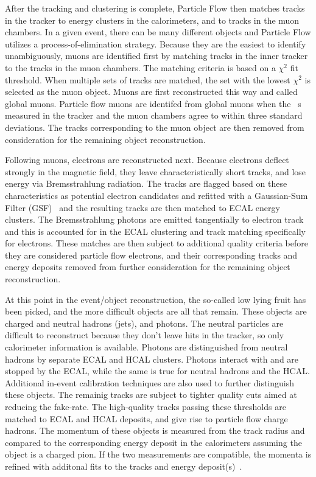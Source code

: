 After the tracking and clustering is complete, Particle Flow then matches tracks in the tracker to energy clusters in the calorimeters, and to tracks in the muon chambers.
In a given event, there can be many different objects and Particle Flow utilizes
a process-of-elimination strategy. Because they are the easiest to identify unambiguously, muons are identified first by matching tracks in the inner tracker to the tracks in
the muon chambers. The matching criteria is based on a $\chi^{2}$ fit threshold. When multiple sets of tracks are matched, the set with the lowest $\chi^{2}$ is selected as the
muon object. Muons are first reconstructed this way and called global muons. Particle flow muons are identifed from global muons when the \pt~s measured in the tracker and the
muon chambers agree to within three standard deviations. The tracks corresponding to the muon object are then removed from consideration for the remaining object reconstruction. 

Following muons, electrons are reconstructed next. Because electrons deflect strongly in the magnetic field, they leave characteristically short tracks, and lose energy via
Bremsstrahlung radiation. The tracks are flagged based on these characteristics as potential electron candidates and refitted with a Gaussian-Sum Filter (GSF)~\cite{gsf} and the
resulting tracks are then matched to ECAL energy clusters. The Bremsstrahlung photons are emitted tangentially to electron track and this is accounted for in the ECAL clustering
and track matching specifically for electrons. These matches are then subject to additional quality criteria before they are considered particle flow electrons, and their
corresponding tracks and energy deposits removed from further consideration for the remaining object reconstruction. 

At this point in the event/object reconstruction, the so-called low lying fruit has been picked, and the more difficult objects are all that remain. These objects are charged
and neutral hadrons (jets), and photons. The neutral particles are difficult to reconstruct because they don't leave hits in the tracker, so only calorimeter information is
available. Photons are distinguished from neutral hadrons by separate ECAL and HCAL clusters. Photons interact with and are stopped by the ECAL, while the same is true for
neutral hadrons and the HCAL. Additional in-event calibration techniques are also used to further distinguish these objects. The remainig tracks are subject to tighter
quality cuts aimed at reducing the fake-rate. The high-quality tracks passing these thresholds are matched to ECAL and HCAL deposits, and give rise to particle flow 
charge hadrons. The momentum of these objects is measured from the track radius and compared to the corresponding energy deposit in the calorimeters assuming the object is
a charged pion. If the two measurements are compatible, the momenta is refined with additonal fits to the tracks and energy deposit(s)~\cite{CMS-PFT-09-001}.

